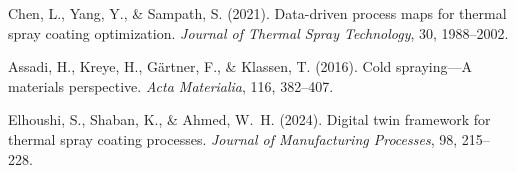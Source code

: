 \documentclass[11pt,letterpaper]{article}
\begin{document}
\begin{enumerate}[nosep,label={[\arabic*]}]
  \item Chen, L., Yang, Y., \& Sampath, S. (2021). Data-driven process
        maps for thermal spray coating optimization.
        \textit{Journal of Thermal Spray Technology}, 30, 1988--2002.

  \item Assadi, H., Kreye, H., G\"artner, F., \& Klassen, T. (2016).
        Cold spraying---A materials perspective.
        \textit{Acta Materialia}, 116, 382--407.

  \item Elhoushi, S., Shaban, K., \& Ahmed, W.~H. (2024). Digital twin
        framework for thermal spray coating processes. \textit{Journal of
        Manufacturing Processes}, 98, 215--228.
\end{enumerate}
\end{document}
